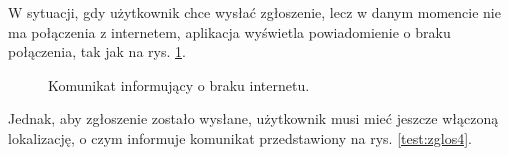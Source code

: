 W sytuacji, gdy użytkownik chce wysłać zgłoszenie, lecz w danym momencie nie ma połączenia z internetem, aplikacja wyświetla powiadomienie o braku połączenia, tak jak na rys. \ref{test:zglos3}. 
\setlength{\fboxrule}{0.5pt}
\begin{figure}[H]
    \centering
    \caption{Komunikat informujący o braku internetu.}
    \label{test:zglos3}
\end{figure}
Jednak, aby zgłoszenie zostało wysłane, użytkownik musi mieć jeszcze włączoną lokalizację, o czym informuje komunikat przedstawiony na rys. \ref{test:zglos4}. 

